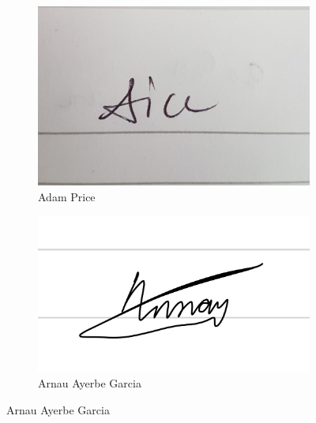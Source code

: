 \documentclass[10pt]{article}
\begin{document}
\begin{center}
\begin{figure}[h]
  \centering
\begin{subfigure}{0.3\textwidth}
\includegraphics[width=0.9\linewidth]{SigAdam} 
\captionsetup{labelformat=empty}
\caption{Adam Price}
\end{subfigure}
\begin{subfigure}{0.3\textwidth}
\includegraphics[width=0.9\linewidth]{SigArnau}
\captionsetup{labelformat=empty}
\caption{Arnau Ayerbe Garcia}
\end{subfigure}
\end{figure}
\end{center}
\end{document}

